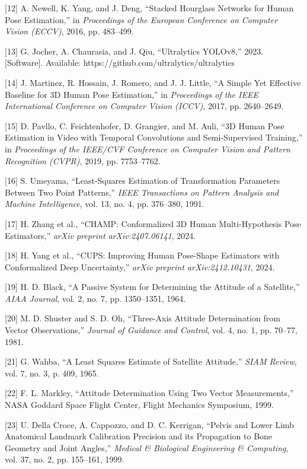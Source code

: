 \documentclass[12pt,a4paper]{report}
\begin{document}
{[12] A. Newell, K. Yang, and J. Deng, ``Stacked Hourglass Networks for Human Pose Estimation,'' in \textit{Proceedings of the European Conference on Computer Vision (ECCV)}, 2016, pp. 483--499.

[13] G. Jocher, A. Chaurasia, and J. Qiu, ``Ultralytics YOLOv8,'' 2023. [Software]. Available: https://github.com/ultralytics/ultralytics

[14] J. Martinez, R. Hossain, J. Romero, and J. J. Little, ``A Simple Yet Effective Baseline for 3D Human Pose Estimation,'' in \textit{Proceedings of the IEEE International Conference on Computer Vision (ICCV)}, 2017, pp. 2640--2649.

[15] D. Pavllo, C. Feichtenhofer, D. Grangier, and M. Auli, ``3D Human Pose Estimation in Video with Temporal Convolutions and Semi-Supervised Training,'' in \textit{Proceedings of the IEEE/CVF Conference on Computer Vision and Pattern Recognition (CVPR)}, 2019, pp. 7753--7762.

[16] S. Umeyama, ``Least-Squares Estimation of Transformation Parameters Between Two Point Patterns,'' \textit{IEEE Transactions on Pattern Analysis and Machine Intelligence}, vol. 13, no. 4, pp. 376--380, 1991.

[17] H. Zhang et al., ``CHAMP: Conformalized 3D Human Multi-Hypothesis Pose Estimators,'' \textit{arXiv preprint arXiv:2407.06141}, 2024.

[18] H. Yang et al., ``CUPS: Improving Human Pose-Shape Estimators with Conformalized Deep Uncertainty,'' \textit{arXiv preprint arXiv:2412.10431}, 2024.

[19] H. D. Black, ``A Passive System for Determining the Attitude of a Satellite,'' \textit{AIAA Journal}, vol. 2, no. 7, pp. 1350--1351, 1964.

[20] M. D. Shuster and S. D. Oh, ``Three-Axis Attitude Determination from Vector Observations,'' \textit{Journal of Guidance and Control}, vol. 4, no. 1, pp. 70--77, 1981.

[21] G. Wahba, ``A Least Squares Estimate of Satellite Attitude,'' \textit{SIAM Review}, vol. 7, no. 3, p. 409, 1965.

[22] F. L. Markley, ``Attitude Determination Using Two Vector Measurements,'' NASA Goddard Space Flight Center, Flight Mechanics Symposium, 1999.

[23] U. Della Croce, A. Cappozzo, and D. C. Kerrigan, ``Pelvis and Lower Limb Anatomical Landmark Calibration Precision and its Propagation to Bone Geometry and Joint Angles,'' \textit{Medical \& Biological Engineering \& Computing}, vol. 37, no. 2, pp. 155--161, 1999.

}
\end{document}

